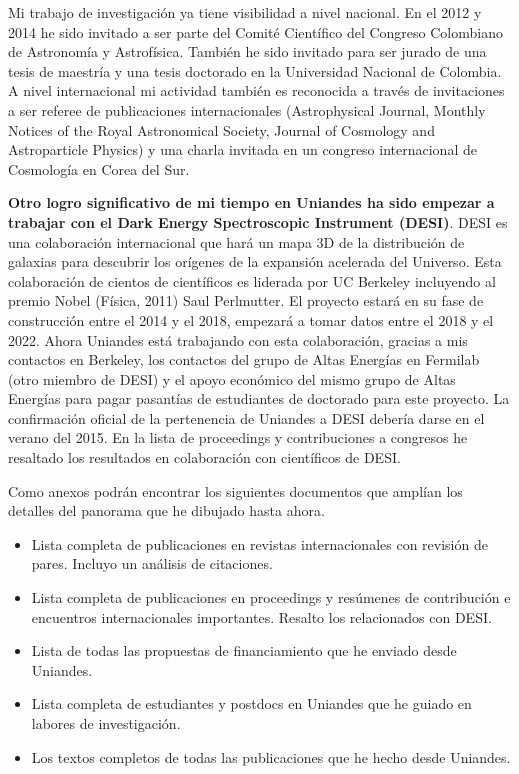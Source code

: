 \documentclass[letterpaper,12pt,onecolumn]{article}
\begin{document}
Mi trabajo de investigaci\'on ya tiene visibilidad a nivel nacional. En
el 2012 y 2014 he sido invitado a ser parte del Comit\'e Cient\'ifico del
Congreso Colombiano de Astronom\'ia y Astrof\'isica. Tambi\'en he sido
invitado para ser jurado de una tesis de maestr\'ia y una tesis
doctorado en la Universidad Nacional de Colombia.  A nivel
internacional mi actividad tambi\'en es reconocida a trav\'es de
invitaciones a ser referee de publicaciones internacionales
(Astrophysical Journal, Monthly Notices of the Royal Astronomical
Society, Journal of Cosmology and Astroparticle Physics) y una charla
invitada en un congreso internacional de Cosmolog\'ia en Corea del Sur.    


{\bf Otro logro significativo de mi tiempo en Uniandes ha sido
empezar a trabajar con el Dark Energy Spectroscopic Instrument (DESI)}. DESI
es una colaboraci\'on internacional que har\'a un mapa 3D de la
distribuci\'on de galaxias para descubrir los or\'igenes de la expansi\'on
acelerada del Universo. Esta colaboraci\'on de cientos de cient\'ificos es
liderada por UC Berkeley incluyendo al premio Nobel (F\'isica, 2011)
Saul Perlmutter. El proyecto estar\'a en su fase de construcci\'on entre el
2014 y el 2018, empezar\'a a tomar datos entre el 2018 y el 2022. Ahora
Uniandes est\'a trabajando con esta colaboraci\'on, gracias a mis
contactos en Berkeley, los contactos del grupo de Altas Energ\'ias en
Fermilab (otro miembro de DESI) y el apoyo econ\'omico del mismo grupo
de Altas Energ\'ias para pagar pasant\'ias de estudiantes de doctorado
para este proyecto. La confirmaci\'on oficial de la pertenencia de
Uniandes a DESI deber\'ia darse en el verano del 2015. En la lista de
proceedings y contribuciones a congresos he resaltado los resultados
en colaboraci\'on con cient\'ificos de DESI.

Como anexos podr\'an encontrar los siguientes documentos que
ampl\'ian los detalles del panorama que he dibujado hasta ahora.

\begin{itemize}
\item Lista completa de publicaciones en revistas internacionales
  con revisi\'on de pares. Incluyo un an\'alisis de citaciones.
\item Lista completa de publicaciones en proceedings y res\'umenes de
  contribuci\'on e encuentros internacionales importantes. Resalto los
  relacionados con DESI.
\item Lista de todas las propuestas de financiamiento que he enviado
  desde Uniandes.
\item Lista completa de estudiantes y postdocs en Uniandes que he guiado
  en labores de investigaci\'on. 
\item Los textos completos de todas las publicaciones que he hecho desde
  Uniandes.
\end{itemize}
\end{document}
